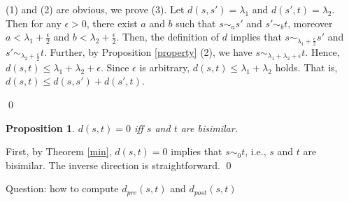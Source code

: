 \documentclass[contract,10pt]{elsarticle}
\newtheorem{prop}{Proposition}
\newenvironment{proposition}{\begin{prop} \rm }{\end{prop}}
\newenvironment{proof}{{\noindent \bfseries Proof.}}{\qed}
\newcommand{\R}[1]{{\color{red}   #1}}
\begin{document}
\begin{proof} (1) and (2) are obvious, we prove (3).
Let $d(s,s')=\lambda_1$ and $d(s',t)=\lambda_2$. Then for any $\epsilon>0$, there exist $a$ and $b$ such that $s\sim_{a} s'$ and $s'\sim_{b} t$, moreover $a<\lambda_1+\frac{\epsilon}{2}$ and $b<\lambda_2+\frac{\epsilon}{2}$.
Then, the definition of $d$ implies that $s\sim_{\lambda_1+\frac{\epsilon}{2}} s'$ and $s'\sim_{\lambda_2+\frac{\epsilon}{2}} t$. Further, by Proposition \ref{property} (2), we have $s\sim_{\lambda_1+\lambda_2+\epsilon} t$.
Hence, $d(s,t)\leq \lambda_1+\lambda_2+\epsilon$. Since $\epsilon$ is arbitrary, $d(s,t)\leq \lambda_1+\lambda_2$ holds. That is, $d(s,t)\leq d(s,s')+d(s',t)$.


\end{proof}

\begin{proposition} $d(s,t)=0$ iff $s$ and $t$ are bisimilar. \end{proposition}
\begin{proof}
First, by Theorem \ref{min}, $d(s,t)=0$ implies that $s\sim_{0} t$, i.e., $s$ and $t$ are bisimilar. The inverse direction is straightforward.
\end{proof}

\vskip1cm

\R {Question: how to compute $d_{pre}(s,t)$ and $d_{post}(s,t)$}
\end{document}
